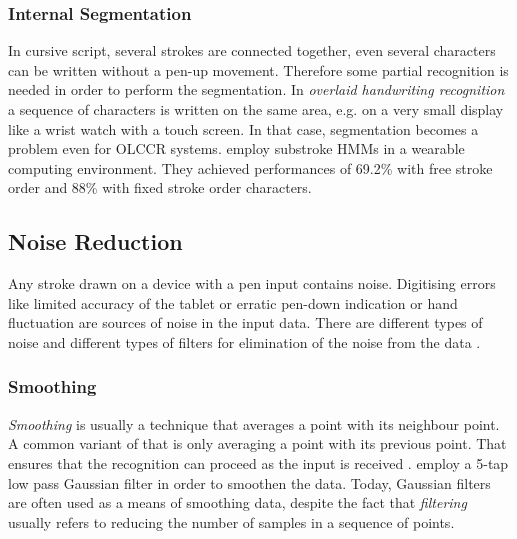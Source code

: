 \subsubsection{Internal Segmentation}
\label{sec:internalsegmentation}
In cursive script, several strokes are connected together, even several 
characters can be written without a pen-up movement. Therefore some partial 
recognition is needed in order to perform the segmentation.
In \emph{overlaid handwriting recognition} a sequence of characters is written 
on the same area, e.g. on a very small display like a wrist watch with a touch 
screen. In that case, segmentation becomes a problem even for OLCCR systems.
 employ substroke HMMs in a wearable computing 
environment. They achieved performances of 69.2\% with free stroke order
and 88\% with fixed stroke order characters.

\subsection{Noise Reduction} 
\label{sec:noisereduction}
Any stroke drawn on a device with a pen input contains noise. Digitising errors
like limited accuracy of the tablet or erratic pen-down indication or hand 
fluctuation are sources of noise in the input data.  There are different types 
of noise and different types of filters for elimination of the noise from the 
data .

\subsubsection{Smoothing}
\label{sec:smoothing}
\emph{Smoothing} is usually a technique that averages a point with its 
neighbour point. A common variant of that is only averaging a point with its
previous point. That ensures that the recognition can proceed as the input
is received .  employ a 5-tap low 
pass Gaussian filter in order to smoothen the data. Today, Gaussian filters are 
often used as a means of smoothing data, despite the fact that \emph{filtering}
usually refers to reducing the number of samples in a sequence of points.

